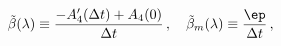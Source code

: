 \begin{equation}
\tilde{\beta} (\lambda) \equiv \frac{- A'_4 (\Delta t) + A_4
(0)}{\Delta t}\, , \quad
\tilde{\beta}_m (\lambda) \equiv \frac{\ep}{\Delta t}\, ,
\end{equation}

